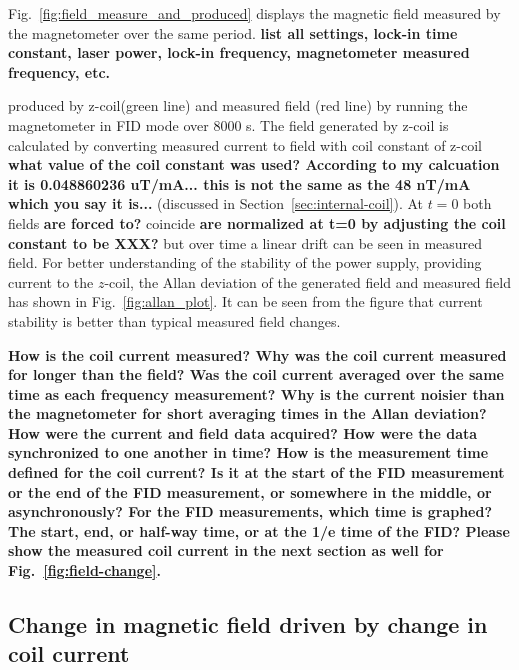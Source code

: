 Fig.~\ref{fig:field_measure_and_produced} displays the magnetic field
measured by the magnetometer over the same period.  {\bf list all
  settings, lock-in time constant, laser power, lock-in frequency,
  magnetometer measured frequency, etc.}

produced by z-coil(green line) and measured field (red line) by
running the magnetometer in FID mode over 8000 s. The field generated
by z-coil is calculated by converting measured current to field with
coil constant of z-coil {\bf what value of the coil constant was used?
  According to my calcuation it is 0.048860236 uT/mA... this is not
  the same as the 48 nT/mA which you say it is...} (discussed in
Section~\ref{sec:internal-coil}).  At $t=0$ both fields {\bf are
  forced to?} coincide {\bf are normalized at t=0 by adjusting the
  coil constant to be XXX?} but over time a linear drift can be seen
in measured field.  For better understanding of the stability of the
power supply, providing current to the $z$-coil, the Allan deviation
of the generated field and measured field has shown in
Fig.~\ref{fig:allan_plot}.  It can be seen from the figure that
current stability is better than typical measured field changes.

{\bf How is the coil current measured?  Why was the coil current
  measured for longer than the field?  Was the coil current averaged
  over the same time as each frequency measurement?  Why is the
  current noisier than the magnetometer for short averaging times in
  the Allan deviation?  How were the current and field data acquired?
  How were the data synchronized to one another in time?  How is the
  measurement time defined for the coil current?  Is it at the start
  of the FID measurement or the end of the FID measurement, or
  somewhere in the middle, or asynchronously?  For the FID
  measurements, which time is graphed?  The start, end, or half-way
  time, or at the 1/e time of the FID?  Please show the measured coil
  current in the next section as well for
  Fig.~\ref{fig:field-change}.}



\subsection{Change in magnetic field driven by change in coil current}

